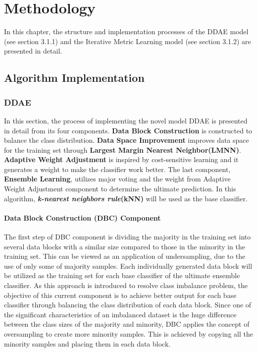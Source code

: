 \chapter{Methodology}
In this chapter, the structure and implementation processes of the DDAE model (see section 3.1.1) and the Iterative Metric Learning model (see section 3.1.2) are presented in detail.

\section{Algorithm Implementation}
\subsection{DDAE}
In this section, the process of implementing the novel model DDAE\cite{73} is presented in detail from its four components. \textbf{Data Block Construction} is constructed to balance the class distribution. \textbf{Data Space Improvement} improves data space for the training set through \textbf{Largest Margin Nearest Neighbor(LMNN)}\cite{69}. \textbf{Adaptive Weight Adjustment} is inspired by cost-sensitive learning and it generates a weight to make the classifier work better. The last component, \textbf{Ensemble Learning}, utilizes major voting and the weight from Adaptive Weight Adjustment component to determine the ultimate prediction. In this algorithm, \textbf{\textit{k-nearest neighbors rule}}\textbf{(kNN)}\cite{75} will be used as the base classifier.

\subsubsection{Data Block Construction (DBC) Component}
The first step of DBC component is dividing the majority in the training set into several data blocks with a similar size compared to those in the minority in the training set. This can be viewed as an application of undersampling, due to the use of only some of majority samples. Each individually generated data block will be utilized as the training set for each base classifier of the ultimate ensemble classifier. As this approach is introduced to resolve class imbalance problem, the objective of this current component is to achieve better output for each base classifier through balancing the class distribution of each data block. Since one of the significant characteristics of an imbalanced dataset is the huge difference between the class sizes of the majority and minority, DBC applies the concept of oversampling to create more minority samples. This is achieved by copying all the minority samples and placing them in each data block.

